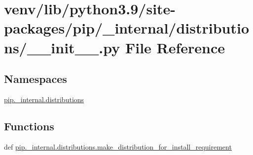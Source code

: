 \hypertarget{venv_2lib_2python3_89_2site-packages_2pip_2__internal_2distributions_2____init_____8py}{}\section{venv/lib/python3.9/site-\/packages/pip/\+\_\+internal/distributions/\+\_\+\+\_\+init\+\_\+\+\_\+.py File Reference}
\label{venv_2lib_2python3_89_2site-packages_2pip_2__internal_2distributions_2____init_____8py}
\subsection*{Namespaces}
\begin{DoxyCompactItemize}
\item 
 \hyperlink{namespacepip_1_1__internal_1_1distributions}{pip.\+\_\+internal.\+distributions}
\end{DoxyCompactItemize}
\subsection*{Functions}
\begin{DoxyCompactItemize}
\item 
def \hyperlink{namespacepip_1_1__internal_1_1distributions_a64c482771770bf2e094b697f00da5923}{pip.\+\_\+internal.\+distributions.\+make\+\_\+distribution\+\_\+for\+\_\+install\+\_\+requirement}
\end{DoxyCompactItemize}
